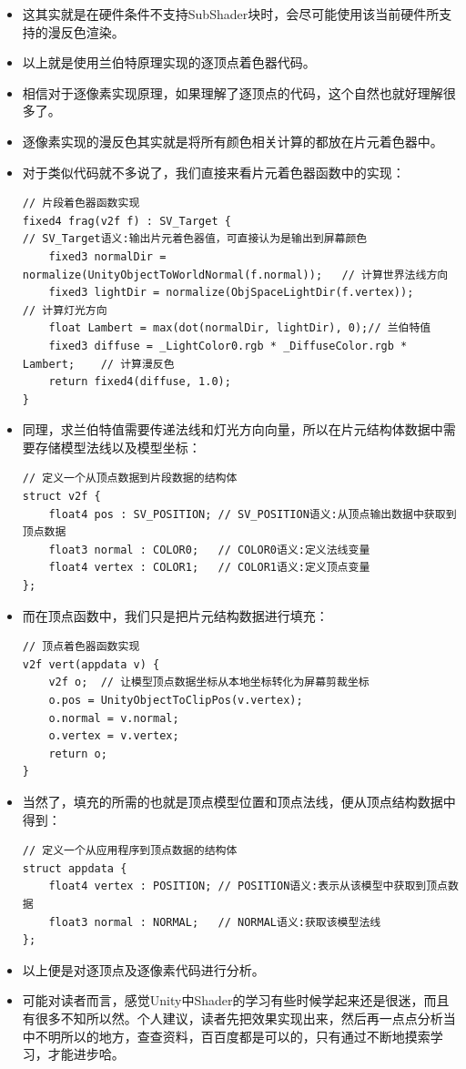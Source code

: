 \documentclass[9pt, b5paper]{article}
\begin{document}
\begin{itemize}
\begin{verbatim}
\end{verbatim}
\item 这其实就是在硬件条件不支持SubShader块时，会尽可能使用该当前硬件所支持的漫反色渲染。
\item 以上就是使用兰伯特原理实现的逐顶点着色器代码。
\item 相信对于逐像素实现原理，如果理解了逐顶点的代码，这个自然也就好理解很多了。
\item 逐像素实现的漫反色其实就是将所有颜色相关计算的都放在片元着色器中。
\item 对于类似代码就不多说了，我们直接来看片元着色器函数中的实现：
\begin{verbatim}
// 片段着色器函数实现  
fixed4 frag(v2f f) : SV_Target {
// SV_Target语义:输出片元着色器值，可直接认为是输出到屏幕颜色 
    fixed3 normalDir = normalize(UnityObjectToWorldNormal(f.normal));   // 计算世界法线方向  
    fixed3 lightDir = normalize(ObjSpaceLightDir(f.vertex));            // 计算灯光方向  
    float Lambert = max(dot(normalDir, lightDir), 0);// 兰伯特值  
    fixed3 diffuse = _LightColor0.rgb * _DiffuseColor.rgb * Lambert;    // 计算漫反色  
    return fixed4(diffuse, 1.0);  
}
\end{verbatim}
\item 同理，求兰伯特值需要传递法线和灯光方向向量，所以在片元结构体数据中需要存储模型法线以及模型坐标：
\begin{verbatim}
// 定义一个从顶点数据到片段数据的结构体  
struct v2f {  
    float4 pos : SV_POSITION; // SV_POSITION语义:从顶点输出数据中获取到顶点数据  
    float3 normal : COLOR0;   // COLOR0语义:定义法线变量  
    float4 vertex : COLOR1;   // COLOR1语义:定义顶点变量  
};
\end{verbatim}
\item 而在顶点函数中，我们只是把片元结构数据进行填充：
\begin{verbatim}
// 顶点着色器函数实现  
v2f vert(appdata v) {  
    v2f o;  // 让模型顶点数据坐标从本地坐标转化为屏幕剪裁坐标  
    o.pos = UnityObjectToClipPos(v.vertex);
    o.normal = v.normal;  
    o.vertex = v.vertex;  
    return o;  
}
\end{verbatim}
\item 当然了，填充的所需的也就是顶点模型位置和顶点法线，便从顶点结构数据中得到：
\begin{verbatim}
// 定义一个从应用程序到顶点数据的结构体  
struct appdata {  
    float4 vertex : POSITION; // POSITION语义:表示从该模型中获取到顶点数据  
    float3 normal : NORMAL;   // NORMAL语义:获取该模型法线  
};
\end{verbatim}
\item 以上便是对逐顶点及逐像素代码进行分析。
\item 可能对读者而言，感觉Unity中Shader的学习有些时候学起来还是很迷，而且有很多不知所以然。个人建议，读者先把效果实现出来，然后再一点点分析当中不明所以的地方，查查资料，百百度都是可以的，只有通过不断地摸索学习，才能进步哈。
\end{itemize}
\end{document}
